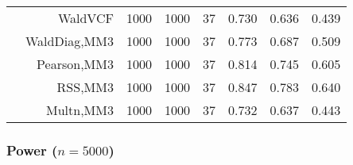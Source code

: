 \documentclass[
]{article}
\begin{document}
\begin{table}[H]
{\begin{tabular}[t]{lrrrrrrr}
\hspace{1em} & WaldVCF & 1000 & 1000 & 37 & 0.730 & 0.636 & 0.439\\

\hspace{1em} & WaldDiag,MM3 & 1000 & 1000 & 37 & 0.773 & 0.687 & 0.509\\

\hspace{1em} & Pearson,MM3 & 1000 & 1000 & 37 & 0.814 & 0.745 & 0.605\\

\hspace{1em} & RSS,MM3 & 1000 & 1000 & 37 & 0.847 & 0.783 & 0.640\\

\hspace{1em} & Multn,MM3 & 1000 & 1000 & 37 & 0.732 & 0.637 & 0.443\\
\bottomrule
\end{tabular}}
\endgroup{}
\end{table}

\hypertarget{power-n5000}{%
\subsubsection{\texorpdfstring{Power
(\(n=5000\))}{Power (n=5000)}}\label{power-n5000}}
\end{document}
